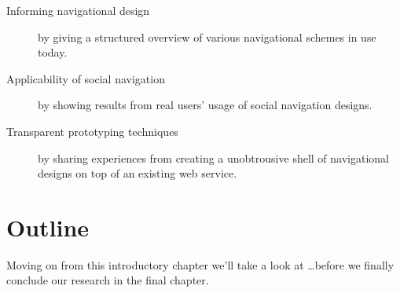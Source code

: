 \begin{description}
  \item[Informing navigational design] by giving a structured overview of
    various navigational schemes in use today.
  \item[Applicability of social navigation] by showing results from real
    users' usage of social navigation designs.
  \item[Transparent prototyping techniques] by sharing experiences from
    creating a unobtrousive shell of navigational designs on top of an
    existing web service.
\end{description}

\section{Outline}

Moving on from this introductory chapter we'll take a look at \ldots before we
finally conclude our research in the final chapter.
